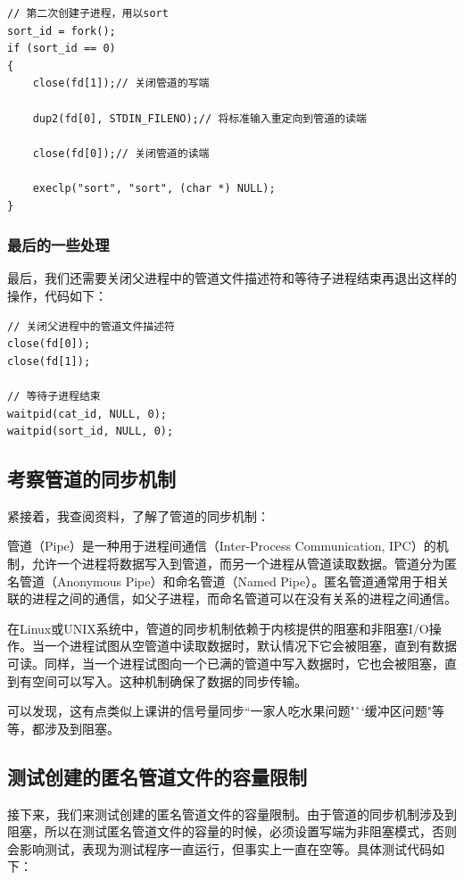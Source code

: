 \documentclass{LabReport}
\begin{document}
\begin{lstlisting}
// 第二次创建子进程，用以sort
sort_id = fork();
if (sort_id == 0) 
{ 
    close(fd[1]);// 关闭管道的写端
	
    dup2(fd[0], STDIN_FILENO);// 将标准输入重定向到管道的读端
	
    close(fd[0]);// 关闭管道的读端
	
    execlp("sort", "sort", (char *) NULL);
}
\end{lstlisting}

	\subsubsection{最后的一些处理}
	最后，我们还需要关闭父进程中的管道文件描述符和等待子进程结束再退出这样的操作，代码如下：
	
\begin{lstlisting}
// 关闭父进程中的管道文件描述符
close(fd[0]);
close(fd[1]);

// 等待子进程结束
waitpid(cat_id, NULL, 0);
waitpid(sort_id, NULL, 0);
\end{lstlisting}
	
	\subsection{考察管道的同步机制}
	紧接着，我查阅资料，了解了管道的同步机制：\par
	\hspace{0em}管道（Pipe）是一种用于进程间通信（Inter-Process Communication, IPC）的机制，允许一个进程将数据写入到管道，而另一个进程从管道读取数据。管道分为匿名管道（Anonymous Pipe）和命名管道（Named Pipe）。匿名管道通常用于相关联的进程之间的通信，如父子进程，而命名管道可以在没有关系的进程之间通信。\par
	\hspace{0em}在Linux或UNIX系统中，管道的同步机制依赖于内核提供的阻塞和非阻塞I/O操作。当一个进程试图从空管道中读取数据时，默认情况下它会被阻塞，直到有数据可读。同样，当一个进程试图向一个已满的管道中写入数据时，它也会被阻塞，直到有空间可以写入。这种机制确保了数据的同步传输。\par
	\hspace{0em}可以发现，这有点类似上课讲的信号量同步``一家人吃水果问题"``缓冲区问题"等等，都涉及到阻塞。
	
	\subsection{测试创建的匿名管道文件的容量限制}
	接下来，我们来测试创建的匿名管道文件的容量限制。由于管道的同步机制涉及到阻塞，所以在测试匿名管道文件的容量的时候，必须设置写端为非阻塞模式，否则会影响测试，表现为测试程序一直运行，但事实上一直在空等。具体测试代码如下：
	
\end{document}
